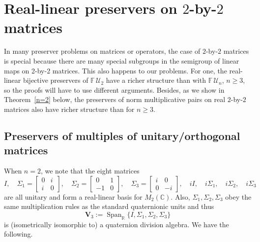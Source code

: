 \documentclass[11pt]{article}
\numberwithin{equation}{section}
\def\IF{{\mathbb F}}
\def\IC{{\mathbb C}}
\def\IR{{\mathbb R}}
\def\bV{{\mathbf V}}
\def\span{{\mathop{\mathrm{Span}}\nolimits}}
\def\bV{{\mathbf V}}
\begin{document}
\section{Real-linear preservers on  $2$-by-$2$ matrices}
In many preserver problems on matrices or operators,
the case of $2$-by-$2$ matrices is special because there are many special subgroups
in the semigroup of linear maps on 2-by-2 matrices.  This also happens to our problems.
 For one, the real-linear bijective preservers of $\IF\,{\mathcal U}_2$ have a richer structure than with $\IF\,{\mathcal U}_n$, $n\ge 3$, so the proofs will have to use different arguments.    Besides, as we show in Theorem~\ref{n=2} below, the preservers of  norm multiplicative pairs on real $2$-by-$2$  matrices also have richer structure than for $n\ge 3$.

\subsection{Preservers of multiples of unitary/orthogonal matrices}
When $n = 2$, we note that the eight matrices
\begin{equation}\label{eq:quaternions}
 I,\quad \Sigma_1 =\left[\begin{matrix}0 & i\\
                             i &0
                            \end{matrix}\right],\quad
 \Sigma _2  =\left[\begin{matrix}0 &1\\
                             -1&0
                            \end{matrix}\right],\quad\Sigma_3=\left[\begin{matrix}i&0\\
                             0 &-i
                            \end{matrix}\right] , \quad i I,\quad  i\Sigma_1,\quad i\Sigma_2,\quad i\Sigma_3
\end{equation}
are all unitary and form a real-linear basis for $M_2(\IC)$. Also, $\Sigma_1,\Sigma_2,\Sigma_3$  obey the same multiplication rules as the standard quaternionic units and thus
$$\bV_3:=\span_{\IR}\{I,\Sigma_1,\Sigma_2,\Sigma_3\}$$
is (isometrically isomorphic to) a  quaternion division algebra.
                            We have the following.
\end{document}
